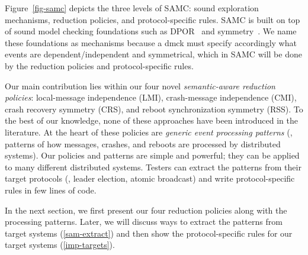 Figure~\ref{fig-samc} depicts the three levels of SAMC: sound
exploration mechanisms, reduction policies, and protocol-specific
rules.  SAMC is built on top of sound model checking foundations such
as DPOR~\cite{Flanagan+05-Dpor, Godefroid+96-Dpor} and
symmetry~\cite{Clarke+98-SymReduct, Prasad+00-SymBasedMc}.  We name
these foundations as mechanisms because a dmck must specify
accordingly what events are dependent/independent and symmetrical,
which in SAMC will be done by the reduction policies and
protocol-specific rules.


Our main contribution lies within our four novel {\em semantic-aware
  reduction policies}: local-message independence (LMI), crash-message
independence (CMI), crash recovery symmetry (CRS), and reboot
synchronization symmetry (RSS).  To the best of our knowledge, none of
these approaches have been introduced in the literature.  At the heart
of these policies are {\em generic event processing patterns} (\ie,
patterns of how messages, crashes, and reboots are processed by
distributed systems).  Our policies and patterns are simple and
powerful; they can be applied to many different distributed systems.  Testers
can extract the patterns from their target protocols (\eg,
leader election, atomic broadcast) and write protocol-specific
rules in few lines of code.

In the next section, we first present our four reduction policies
along with the processing patterns.  Later, we will discuss ways to
extract the patterns from target systems (\sec\ref{sam-extract}) and
then show the protocol-specific rules for our target systems
(\sec\ref{imp-targets}).


